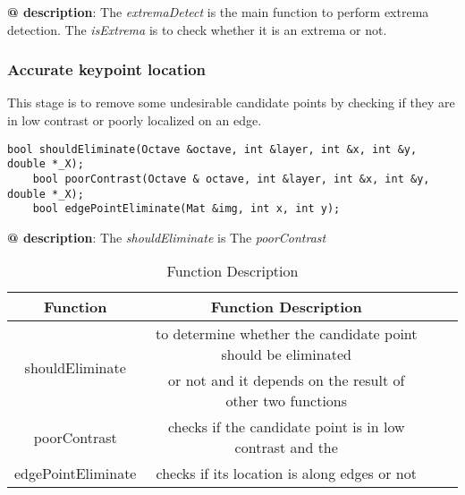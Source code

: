 \documentclass[paper=a4, fontsize=11pt]{scrartcl} %
\numberwithin{equation}{section} %
\numberwithin{figure}{section} %
\numberwithin{table}{section} %
\begin{document}
\textbf{@ description}: The \textsl{extremaDetect} is the main function to perform extrema detection. The \textsl{isExtrema} is to check whether it is an extrema or not.

\subsubsection{Accurate keypoint location}

This stage is to remove some undesirable candidate points by checking if they are in low contrast or poorly localized on an edge.

\begin{lstlisting}
bool shouldEliminate(Octave &octave, int &layer, int &x, int &y, double *_X);
    bool poorContrast(Octave & octave, int &layer, int &x, int &y, double *_X);
    bool edgePointEliminate(Mat &img, int x, int y);
\end{lstlisting}

\textbf{@ description}: The \textsl{shouldEliminate} is  The \textsl{poorContrast} 

\begin{table}[h]
    \centering
    \begin{tabular}{|c|c| lp{}}
        \hline
        \textbf{Function} & \textbf{Function Description} \\\hline
\multirow{2}{*}{shouldEliminate} &  to determine whether the candidate point should be eliminated \\& or not and it depends on the result of other two functions\\\hline
poorContrast &  checks if the candidate point is in low contrast and the \\\hline
edgePointEliminate & checks if its location is along edges or not\\\hline
    \end{tabular}
    \caption{Function Description}\label{nolock}
\end{table}
\end{document}
